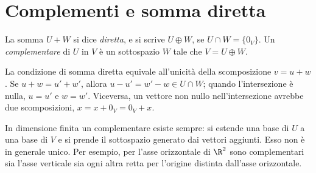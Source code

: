 \section{Complementi e somma diretta}
\begin{definizione}
La somma $U+W$ si dice \emph{diretta}, e si scrive $U\oplus W$,
se $U\cap W=\{0_V\}$. Un \emph{complementare} di $U$ in $V$
è un sottospazio $W$ tale che $V=U\oplus W$.
\end{definizione}
La condizione di somma diretta equivale all'unicità della
scomposizione $v=u+w$. Se $u+w=u'+w'$, allora
$u-u'=w'-w\in U\cap W$; quando l'intersezione è nulla,
$u=u'$ e $w=w'$. Viceversa, un vettore non nullo nell'intersezione
avrebbe due scomposizioni, $x=x+0_V=0_V+x$.

In dimensione finita un complementare esiste sempre: si estende
una base di $U$ a una base di $V$ e si prende il sottospazio
generato dai vettori aggiunti. Esso non è in generale unico.
Per esempio, per l'asse orizzontale di $\R^2$ sono complementari
sia l'asse verticale sia ogni altra retta per l'origine distinta
dall'asse orizzontale.
\begin{schema}
\end{schema}


